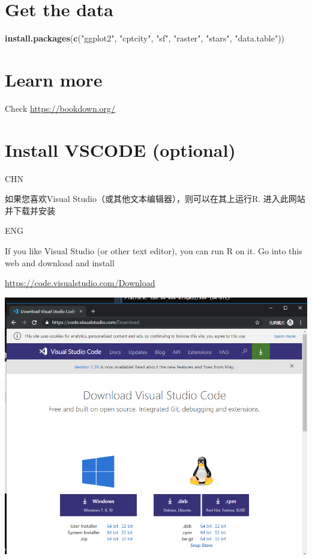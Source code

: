 \documentclass[]{book}
\newenvironment{Shaded}{\begin{snugshade}}{\end{snugshade}}
\newcommand{\KeywordTok}[1]{\textcolor[rgb]{0.13,0.29,0.53}{\textbf{#1}}}
\newcommand{\NormalTok}[1]{#1}
\newcommand{\StringTok}[1]{\textcolor[rgb]{0.31,0.60,0.02}{#1}}
\begin{document}
\hypertarget{get-the-data}{%
\section{Get the data}\label{get-the-data}}

\begin{Shaded}
\begin{Highlighting}[]
\KeywordTok{install.packages}\NormalTok{(}\KeywordTok{c}\NormalTok{(}\StringTok{"ggplot2"}\NormalTok{, }\StringTok{"cptcity"}\NormalTok{, }\StringTok{"sf"}\NormalTok{, }\StringTok{"raster"}\NormalTok{, }\StringTok{"stars"}\NormalTok{, }\StringTok{"data.table"}\NormalTok{))}
\end{Highlighting}
\end{Shaded}

\hypertarget{learn-more}{%
\section{Learn more}\label{learn-more}}

Check \url{https://bookdown.org/}

\hypertarget{install-vscode-optional}{%
\section{Install VSCODE (optional)}\label{install-vscode-optional}}

CHN

如果您喜欢Visual Studio（或其他文本编辑器），则可以在其上运行R. 进入此网站并下载并安装

ENG

If you like Visual Studio (or other text editor), you can run R on it. Go into this web and download and install

\url{https://code.visualstudio.com/Download}

\includegraphics{fig/05.png}
\end{document}

